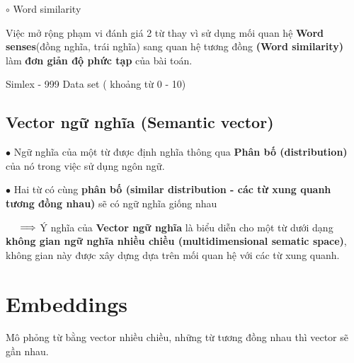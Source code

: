 \documentclass[final,letterpaper,twoside,12pt]{report}
\begin{document}
$\circ$ Word similarity

Việc mở rộng phạm vi đánh giá 2 từ thay vì sử dụng mối quan hệ \textbf{Word senses}(đồng nghĩa, trái nghĩa) sang quan hệ tương đồng \textbf{(Word similarity)} làm \textbf{đơn giản độ phức tạp } của bài toán.

Simlex - 999 Data set ( khoảng từ 0 - 10)

\begin{center}
\end{center}

\subsection{Vector ngữ nghĩa (Semantic vector)}

$\bullet$ Ngữ nghĩa của một từ được định nghĩa thông qua \textbf{Phân bố (distribution)} của nó trong việc sử dụng ngôn ngữ.

$\bullet$ Hai từ có cùng \textbf{phân bố (similar distribution - các từ xung quanh tương đồng nhau)} sẽ có ngữ nghĩa giống nhau

$\hspace*{0.5cm} \Longrightarrow$ Ý nghĩa của \textbf{Vector ngữ nghĩa} là biểu diễn cho một từ dưới dạng \textbf{không gian ngữ nghĩa nhiều chiều (multidimensional sematic space)}, không gian này được xây dựng dựa trên mối quan hệ với các từ xung quanh.

\section{Embeddings}

Mô phỏng từ bằng vector nhiều chiều, những từ tương đồng nhau thì vector sẽ gần nhau.
\end{document}
